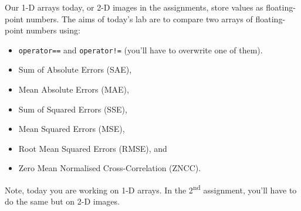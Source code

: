 \documentclass[english,a4paper,12pt,oneside]{article}
\begin{document}
    
    
%
%
%
%    
%    
Our 1-D arrays today, or 2-D images in the assignments, store values as floating-point numbers. 
The aims of today's lab are to compare two arrays of floating-point numbers using:
	\begin{itemize}
        \item \verb+operator==+ and \verb+operator!=+ (you'll have to overwrite one of them).
        \item Sum of Absolute Errors (SAE), 
        \item Mean Absolute Errors (MAE), 
		\item Sum of Squared Errors (SSE),
		\item Mean Squared Errors (MSE),
		\item Root Mean Squared Errors (RMSE),  and 
		\item Zero Mean Normalised Cross-Correlation (ZNCC).
    \end{itemize}

Note, today you are working on 1-D arrays. In the 2\textsuperscript{nd} assignment, you'll have to do the same but on 2-D images. 
\end{document}
